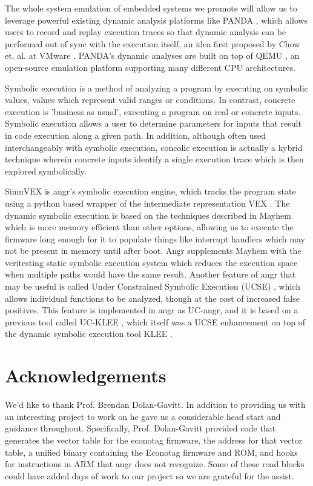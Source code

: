 \documentclass[letterpaper, 10 pt, conference]{ieeeconf}
\begin{document}
The whole system emulation of embedded systems we promote will allow us to leverage powerful existing dynamic analysis platforms like PANDA \cite{panda}, which allows users to record and replay execution traces so that dynamic analysis can be performed out of sync with the execution itself, an idea first proposed by Chow et. al. at VMware \cite{jchow}. PANDA's dynamic analyses are built on top of QEMU \cite{qemu}, an open-source emulation platform supporting many different CPU architectures. 

Symbolic execution \cite{jking} is a method of analyzing a program by executing on symbolic values, values which represent valid ranges or conditions. In contrast, concrete execution is 'business as usual', executing a program on real or concrete inputs. Symbolic execution allows a user to determine parameters for inputs that result in code execution along a given path. In addition, although often used interchangeably with symbolic execution, concolic execution \cite{ksen} is actually a hybrid technique wherein concrete inputs identify a single execution trace which is then explored symbolically. 

SimuVEX is angr's symbolic execution engine, which tracks the program state using a python based wrapper \cite{pyvex} of the intermediate representation VEX \cite{vex}. The dynamic symbolic execution is based on the techniques described in Mayhem \cite{mayhem} which is more memory efficient than other options, allowing us to execute the firmware long enough for it to populate things like interrupt handlers which may not be present in memory until after boot. Angr supplements Mayhem with the veritesting static symbolic execution system \cite{veritesting} which reduces the execution space when multiple paths would have the same result. Another feature of angr that may be useful is called Under Constrained Symbolic Execution (UCSE) \cite{ucklee2}, which allows individual functions to be analyzed, though at the cost of increased false positives. This feature is implemented in angr as UC-angr, and it is based on a previous tool called UC-KLEE \cite{ucklee1}, which itself was a UCSE enhancement on top of the dynamic symbolic execution tool KLEE \cite{klee}.

\section{Acknowledgements}
We’d like to thank Prof. Brendan Dolan-Gavitt. In addition to providing us with an interesting project to work on he gave us a considerable head start and guidance throughout. Specifically, Prof. Dolan-Gavitt provided code that generates the vector table for the econotag firmware, the address for that vector table, a unified binary containing the Econotag firmware and ROM, and hooks for instructions in ARM that angr does not recognize. Some of these road blocks could have added days of work to our project so we are grateful for the assist.

{}

\end{document}

